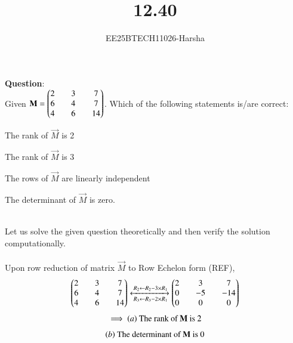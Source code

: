 \documentclass[journal]{IEEEtran}
\begin{document}

\vspace{3cm}

\title{12.40}
\author{EE25BTECH11026-Harsha}
 \maketitle
{\let\newpage\relax\maketitle}

\renewcommand{\thefigure}{\theenumi}
\renewcommand{\thetable}{\theenumi}
\setlength{\intextsep}{10pt} %


\renewcommand{\thetable}{\theenumi}

\textbf{Question}:\\
Given $\mathbf{M}=\begin{pmatrix}2&&3&&7\\6&&4&&7\\4&&6&&14\end{pmatrix}$. Which of the following statements is/are correct:
\begin{enumerate}
\begin{multicols}{2}
    \item The rank of $\vec{M}$ is 2
    \item The rank of $\vec{M}$ is 3
    \item The rows of $\vec{M}$ are linearly independent 
    \item The determinant of $\vec{M}$ is zero.
\end{multicols}
\end{enumerate}
\solution \\
Let us solve the given question theoretically and then verify the solution computationally.\\
\\
Upon row reduction of matrix $\vec{M}$ to Row Echelon form (REF),
\begin{align}
    \begin{pmatrix}2&&3&&7\\6&&4&&7\\4&&6&&14\end{pmatrix}
    \xleftrightarrow[\,R_3 \gets R_3-2 \times R_1]{\,R_2 \gets R_2 - 3 \times R_1}
    \begin{pmatrix}2&&3&&7\\0&&-5&&-14\\0&&0&&0\end{pmatrix}
\end{align}
\begin{align*}
    \implies \text{$\left(a\right)$ The rank of $\mathbf{M}$ is 2}
\end{align*}
\begin{align*}
    \text{$\left(b\right)$ The determinant of $\mathbf{M}$ is 0}
\end{align*}
\end{document}
